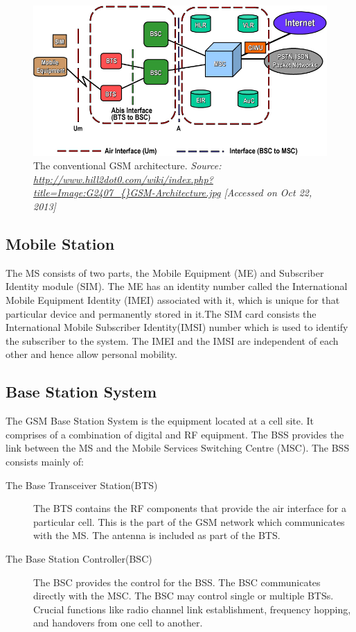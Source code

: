 \begin{figure}[h]
\centering
\includegraphics[width=1\textwidth]{gsmArch}
\caption[The conventional GSM architecture]{The conventional GSM architecture. \emph{Source: \url{http://www.hill2dot0.com/wiki/index.php?title=Image:G2407\_{}GSM-Architecture.jpg} [Accessed on Oct 22, 2013]}}
\label{gsmArch}
\end{figure}

\subsection{Mobile Station}
The MS consists of two parts, the Mobile Equipment (ME) and  Subscriber 
Identity module (SIM). The ME has an identity number called the International
 Mobile Equipment Identity (IMEI) associated with it, which is unique for 
that particular device and permanently stored in it.The SIM card consists 
the International Mobile Subscriber Identity(IMSI) number which is used 
to identify the subscriber to the system. The IMEI and the IMSI are independent 
of each other and hence allow personal mobility.

\subsection{Base Station System}
The GSM Base Station System is the equipment located at a cell site. It
comprises of a combination of digital and RF equipment. The BSS provides 
the link between the MS and the Mobile Services Switching Centre (MSC).
The BSS consists mainly of:
\begin{description}
	\item[The Base Transceiver Station(BTS)]  
	The BTS contains the RF components that provide the air interface for
 a particular cell. This is the part of the GSM network which communicates
 with the MS. The antenna is included as part of the BTS.
	\item[The Base Station Controller(BSC)]  
	The BSC  provides the control for the BSS. The BSC communicates directly 
with the MSC. The BSC may control single or multiple BTSs. Crucial functions 
like radio channel link establishment, frequency hopping, and handovers from
one cell to another.

\end{description}

